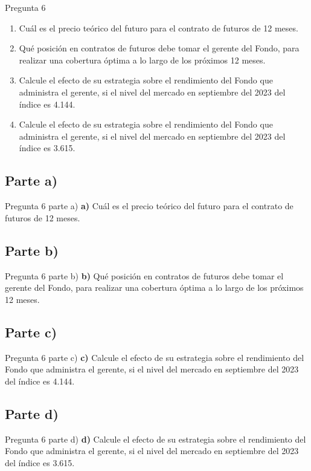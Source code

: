 \documentclass{beamer}
\begin{document}
\begin{frame}{Pregunta 6}
  \begin{enumerate}[label=\textbf{\alph*)}]
    \item Cuál es el precio teórico del futuro para el contrato de futuros de 12 meses.
    \item Qué posición en contratos de futuros debe tomar el gerente del Fondo, para realizar una cobertura óptima a lo largo de los próximos 12 meses.
    \item Calcule el efecto de su estrategia sobre el rendimiento del Fondo que administra el gerente, si el nivel del mercado en septiembre del 2023 del índice es 4.144.
    \item Calcule el efecto de su estrategia sobre el rendimiento del Fondo que administra el gerente, si el nivel del mercado en septiembre del 2023 del índice es 3.615.

\end{enumerate}
\end{frame}

\subsection{Parte a)}

\begin{frame}{Pregunta 6 parte a)}
  \textbf{a)} Cuál es el precio teórico del futuro para el contrato de futuros de 12 meses.
\end{frame}

\subsection{Parte b)}
\begin{frame}{Pregunta 6 parte b)}
  \textbf{b)} Qué posición en contratos de futuros debe tomar el gerente del Fondo, para realizar una cobertura óptima a lo largo de los próximos 12 meses.
\end{frame}

\subsection{Parte c)}
\begin{frame}{Pregunta 6 parte c)}
  \textbf{c)} Calcule el efecto de su estrategia sobre el rendimiento del Fondo que administra el gerente, si el nivel del mercado en septiembre del 2023 del índice es 4.144.
\end{frame}

\subsection{Parte d)}
\begin{frame}{Pregunta 6 parte d)}
  \textbf{d)} Calcule el efecto de su estrategia sobre el rendimiento del Fondo que administra el gerente, si el nivel del mercado en septiembre del 2023 del índice es 3.615.
\end{frame}
\end{document}
